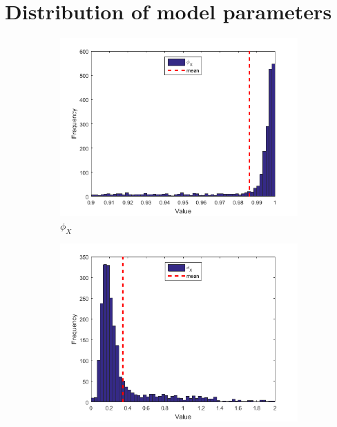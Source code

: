 \documentclass[11pt,a4,twosided,singlespacing,titlepagenumber=on]{scrreprt}
\numberwithin{equation}{chapter} %
\theoremstyle{remark}
\begin{document}
\section{Distribution of model parameters}

\begin{figure}[H]
    \centering
    \begin{subfigure}[t]{0.32\textwidth}
        \centering
        \includegraphics[width=1\textwidth]{res/params/731_1462/1}
        \caption{$\phi_X$}
    \end{subfigure}
    \begin{subfigure}[t]{0.32\textwidth}
        \centering
        \includegraphics[width=1\textwidth]{res/params/731_1462/2}

\end{subfigure}
\end{figure}
\end{document}
